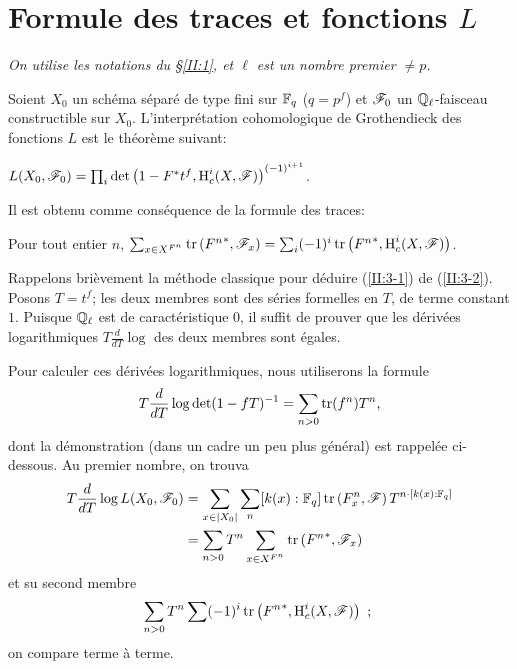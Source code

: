 \documentclass[oneside]{book}
\begin{document}
\section{Formule des traces et fonctions \texorpdfstring{$L$}{L}}\label{II:3}

\emph{On utilise les notations du \S\ref{II:1}, et $\ell$ est un nombre premier 
$\ne p$.}

Soient $X_0$ un schéma séparé de type fini sur $\mathbb{F}_q$ ($q=p^f$) et 
$\mathscr{F}_0$ un $\mathbb{Q}_\ell$-faisceau constructible sur $X_0$. L'interprétation 
cohomologique de Grothendieck des fonctions $L$ est le théorème suivant: 





\begin{theorem_}\label{II:3-1}
$L(X_0,\mathscr{F}_0) = \prod_i \det\left(1-F^* t^f, \operatorname{H}_c^i(X,\mathscr{F})\right)^{(-1)^{i+1}}$. 
\end{theorem_}

Il est obtenu comme conséquence de la formule des traces:





\begin{theorem_}\label{II:3-2}
Pour tout entier $n$, 
$\sum_{x\in X^{F^n}} \operatorname{tr}\left({F^n}^*,\mathscr{F}_x\right) = \sum_i (-1)^i \operatorname{tr}\left({F^n}^*,\operatorname{H}_c^i(X,\mathscr{F})\right)$. 
\end{theorem_}





Rappelons brièvement la méthode classique pour déduire (\ref{II:3-1}) 
de (\ref{II:3-2}). Posons $T=t^f$; les deux membres sont des séries formelles 
en $T$, de terme constant $1$. Puisque $\mathbb{Q}_\ell$ est de caractéristique 
$0$, il suffit de prouver que les dérivées logarithmiques 
$T\frac{d}{dT}\log$ des deux membres sont égales. 

Pour calculer ces dérivées logarithmiques, nous utiliserons la formule 
\[
  T \frac{d}{dT}\log\det(1-f T)^{-1} = \sum_{n>0} \operatorname{tr}(f^n) T^n \text{,}
\]
dont la démonstration (dans un cadre un peu plus général) est rappelée 
ci-dessous. Au premier nombre, on trouva 
\begin{align*}
  T\frac{d}{dT}\log L(X_0,\mathscr{F}_0) 
    &= \sum_{x\in |X_0|} \sum_n [k(x):\mathbb{F}_q] \operatorname{tr}\left(F_x^n,\mathscr{F}\right) T^{n\cdot[k(x):\mathbb{F}_q]} \\
    &= \sum_{n>0} T^n \sum_{x\in X^{F^n}} \operatorname{tr}\left({F^n}^*,\mathscr{F}_x\right)
\end{align*}
et su second membre 
\[
  \sum_{n>0} T^n \sum (-1)^i \operatorname{tr}\left({F^n}^*,\operatorname{H}_c^i(X,\mathscr{F})\right) \text{ ; }
\]
on compare terme à terme. 
\end{document}
